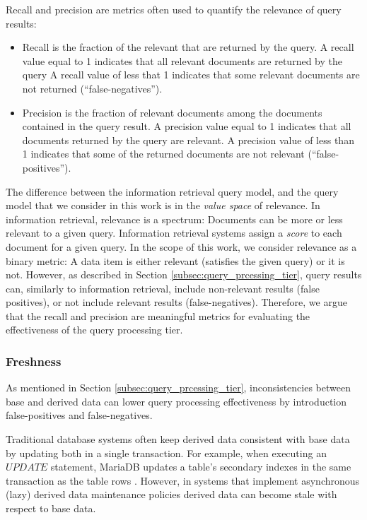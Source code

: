 Recall and precision are metrics often used to quantify the relevance of query results:
\begin{itemize}
  \item Recall is the fraction of the relevant that are returned by the query.
  A recall value equal to 1 indicates that all relevant documents are returned by the query
  A recall value of less that 1 indicates that some relevant documents are not returned (``false-negatives'').

  \item Precision is the fraction of relevant documents among the documents contained in the query result.
  A precision value equal to 1 indicates that all documents returned by the query are relevant.
  A precision value of less than 1 indicates that some of the returned documents are not relevant (``false-positives'').
\end{itemize}

The difference between the information retrieval query model, and the query model that we consider in this work is in the
\textit{value space} of relevance.
In information retrieval, relevance is a spectrum:
Documents can be more or less relevant to a given query.
Information retrieval systems assign a \textit{score} to each document for a given query.
In the scope of this work, we consider relevance as a binary metric:
A data item is either relevant (satisfies the given query) or it is not.
However, as described in Section \ref{subsec:query_prcessing_tier}, query results
can, similarly to information retrieval, include non-relevant results (false positives),
or not include relevant results (false-negatives).
Therefore, we argue that the recall and precision are meaningful metrics for evaluating the effectiveness of the query processing tier.

\subsubsection{Freshness}

As mentioned in Section \ref{subsec:query_prcessing_tier}, inconsistencies between base and derived data can lower query
processing effectiveness by introduction false-positives and false-negatives.

Traditional database systems often keep derived data consistent with base data by updating both in a single transaction.
For example, when executing an $UPDATE$ statement, MariaDB updates a table's secondary indexes in the same transaction
as the table rows \cite{innodb:writepaths}.
However, in systems that implement asynchronous (lazy) derived data maintenance policies \cite{tan:diffindex,
qi:secondaryindexconsistency, shukla:schemaagnostic} derived data can become stale with respect to base data.


